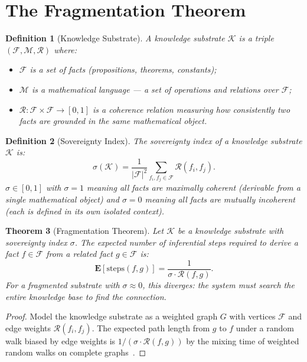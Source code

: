 \documentclass[12pt]{article}
\newtheorem{theorem}{Theorem}
\newtheorem{definition}[theorem]{Definition}
\begin{document}
\section{The Fragmentation Theorem}
\label{sec:frag}

\begin{definition}[Knowledge Substrate]
A \emph{knowledge substrate} $\mathcal{K}$ is a triple $(\mathcal{F}, \mathcal{M}, \mathcal{R})$
where:
\begin{itemize}
  \item $\mathcal{F}$ is a set of \emph{facts} (propositions, theorems, constants);
  \item $\mathcal{M}$ is a \emph{mathematical language} — a set of operations
        and relations over $\mathcal{F}$;
  \item $\mathcal{R}: \mathcal{F} \times \mathcal{F} \to [0,1]$ is a \emph{coherence
        relation} measuring how consistently two facts are grounded in the same
        mathematical object.
\end{itemize}
\end{definition}

\begin{definition}[Sovereignty Index]
\label{def:sigma}
The \emph{sovereignty index} of a knowledge substrate $\mathcal{K}$ is:
\[
  \sigma(\mathcal{K}) = \frac{1}{|\mathcal{F}|^2} \sum_{f_i, f_j \in \mathcal{F}} \mathcal{R}(f_i, f_j).
\]
$\sigma \in [0, 1]$ with $\sigma = 1$ meaning all facts are maximally coherent
(derivable from a single mathematical object) and $\sigma = 0$ meaning all
facts are mutually incoherent (each is defined in its own isolated context).
\end{definition}

\begin{theorem}[Fragmentation Theorem]
\label{thm:frag}
Let $\mathcal{K}$ be a knowledge substrate with sovereignty index $\sigma$.
The expected number of \emph{inferential steps} required to derive a fact
$f \in \mathcal{F}$ from a related fact $g \in \mathcal{F}$ is:
\[
  \mathbf{E}[\mathrm{steps}(f, g)] = \frac{1}{\sigma \cdot \mathcal{R}(f,g)}.
\]
For a fragmented substrate with $\sigma \approx 0$, this diverges: the system
must search the entire knowledge base to find the connection.
\end{theorem}

\begin{proof}
Model the knowledge substrate as a weighted graph $G$ with vertices $\mathcal{F}$
and edge weights $\mathcal{R}(f_i, f_j)$.  The expected path length from $g$ to $f$
under a random walk biased by edge weights is $1/(\sigma \cdot \mathcal{R}(f,g))$
by the mixing time of weighted random walks on complete graphs~\cite{levin2017markov}.
\end{proof}
\end{document}
